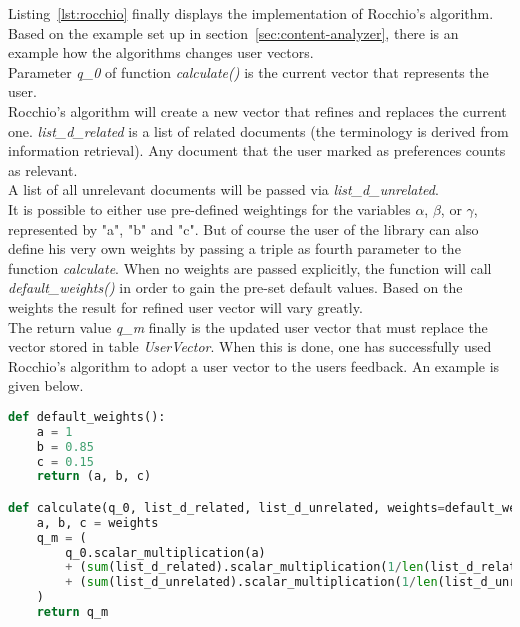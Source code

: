 \noindent
Listing~\ref{lst:rocchio} finally displays the implementation of Rocchio's algorithm.
Based on the example set up in section~\ref{sec:content-analyzer}, there is an example how the algorithms changes user vectors.\\
Parameter \textit{q\_0} of function \textit{calculate()} is the current vector that represents the user.\\
Rocchio's algorithm will create a new vector that refines and replaces the current one.
\textit{list\_d\_related} is a list of related documents (the terminology is derived from information retrieval).
Any document that the user marked as preferences counts as relevant.\\
A list of all unrelevant documents will be passed via \textit{list\_d\_unrelated}.\\
It is possible to either use pre-defined weightings for the variables $\alpha$, $\beta$, or $\gamma$, represented by "a", "b" and "c".
But of course the user of the library can also define his very own weights by passing a triple as fourth parameter to the function \textit{calculate}.
When no weights are passed explicitly, the function will call \textit{default\_weights()} in order to gain the pre-set default values.
Based on the weights the result for refined user vector will vary greatly.\\
The return value \textit{q\_m} finally is the updated user vector that must replace the vector stored in table \textit{UserVector}.
When this is done, one has successfully used Rocchio's algorithm to adopt a user vector to the users feedback.
An example is given below.

\begin{lstlisting}[language=Python,caption={Implementation of Rocchio's algorithm},label={lst:rocchio},float=h]
def default_weights():
    a = 1
    b = 0.85
    c = 0.15
    return (a, b, c)

def calculate(q_0, list_d_related, list_d_unrelated, weights=default_weights()):
    a, b, c = weights
    q_m = (
        q_0.scalar_multiplication(a)
        + (sum(list_d_related).scalar_multiplication(1/len(list_d_related))).scalar_multiplication(b)
        + (sum(list_d_unrelated).scalar_multiplication(1/len(list_d_unrelated))).scalar_multiplication(c)
    )
    return q_m
\end{lstlisting}

